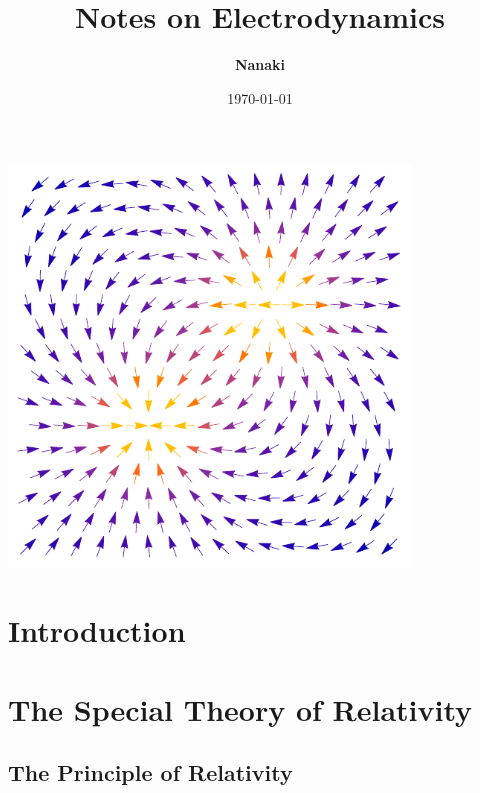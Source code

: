 \documentclass[
    ebook,
    11pt,
    twoside,
    onecolumn,
    openright,
    final
]{memoir}
\begin{document}
\begin{titlingpage}
    \title{\HUGE\textbf{Notes on Electrodynamics}}
    \author{\Large\textbf{Nanaki}}
    \date{\Large{\today}}

    \maketitle
    \begin{center}
        \includegraphics[width=0.8\textwidth]{figures/cover.pdf}
    \end{center}
\end{titlingpage}

\frontmatter

\tableofcontents

\mainmatter

\part{Introduction}


\part{The Special Theory of Relativity}

\chapter{The Principle of Relativity}

\end{document}
